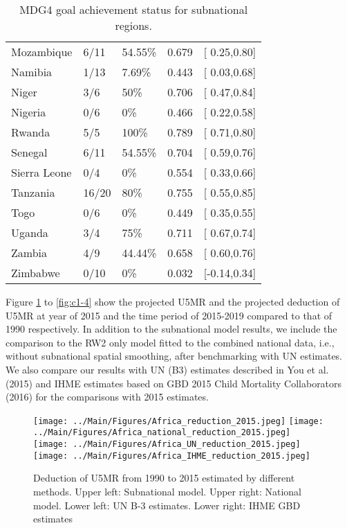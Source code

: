\documentclass[12pt]{article}\usepackage[]{graphicx}\usepackage[]{color}
\begin{document}
\begin{table}[ht]
\begin{tabular}{lllrl}
  Mozambique & 6/11 & 54.55\% & 0.679 & [ 0.25,0.80] \\ 
  Namibia & 1/13 & 7.69\% & 0.443 & [ 0.03,0.68] \\ 
  Niger & 3/6 & 50\% & 0.706 & [ 0.47,0.84] \\ 
  Nigeria & 0/6 & 0\% & 0.466 & [ 0.22,0.58] \\ 
  Rwanda & 5/5 & 100\% & 0.789 & [ 0.71,0.80] \\ 
  Senegal & 6/11 & 54.55\% & 0.704 & [ 0.59,0.76] \\ 
  Sierra Leone & 0/4 & 0\% & 0.554 & [ 0.33,0.66] \\ 
  Tanzania & 16/20 & 80\% & 0.755 & [ 0.55,0.85] \\ 
  Togo & 0/6 & 0\% & 0.449 & [ 0.35,0.55] \\ 
  Uganda & 3/4 & 75\% & 0.711 & [ 0.67,0.74] \\ 
  Zambia & 4/9 & 44.44\% & 0.658 & [ 0.60,0.76] \\ 
  Zimbabwe & 0/10 & 0\% & 0.032 & [-0.14,0.34] \\ 
   \hline
\end{tabular}
\caption{MDG4 goal achievement status for subnational regions.}
\label{tab:mdg}
\end{table}


Figure \ref{fig:c1-1} to \ref{fig:c1-4} show the projected U5MR and the projected deduction of U5MR at year of 2015 and the time period of 2015-2019 compared to that of 1990 respectively. In addition to the subnational model results, we include the comparison to the RW2 only model fitted to the combined national data, i.e., without subnational spatial smoothing, after benchmarking with UN estimates.  We also compare our results with UN (B3) estimates described in You et al. (2015) and IHME estimates based on GBD 2015 Child Mortality Collaborators (2016) for the comparisons with 2015 estimates.  

\begin{figure}[htb]
\texttt{[image: ../Main/Figures/Africa\_reduction\_2015.jpeg]}
\texttt{[image: ../Main/Figures/Africa\_national\_reduction\_2015.jpeg]}
\texttt{[image: ../Main/Figures/Africa\_UN\_reduction\_2015.jpeg]}
\texttt{[image: ../Main/Figures/Africa\_IHME\_reduction\_2015.jpeg]}
\caption{Deduction of U5MR from 1990 to 2015 estimated by different methods. Upper left: Subnational model. Upper right: National model. Lower left: UN B-3 estimates. Lower right: IHME GBD estimates}
\label{fig:c1-1}
\end{figure}
\end{document}
